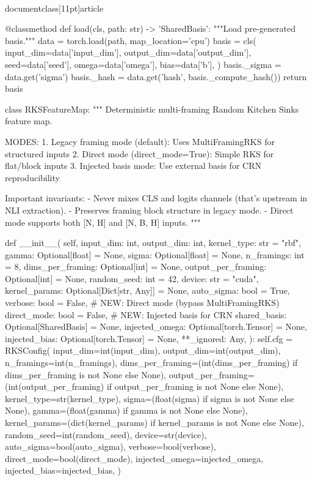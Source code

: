 \\documentclass[11pt]{article}
\begin{document}
\begin{CodeBlock}
    @classmethod
    def load(cls, path: str) -> 'SharedBasis':
        """Load pre-generated basis."""
        data = torch.load(path, map_location='cpu')
        basis = cls(
            input_dim=data['input_dim'],
            output_dim=data['output_dim'],
            seed=data['seed'],
            omega=data['omega'],
            bias=data['b'],
        )
        basis._sigma = data.get('sigma')
        basis._hash = data.get('hash', basis._compute_hash())
        return basis


class RKSFeatureMap:
    """
    Deterministic multi-framing Random Kitchen Sinks feature map.

    MODES:
    1. Legacy framing mode (default): Uses MultiFramingRKS for structured inputs
    2. Direct mode (direct_mode=True): Simple RKS for flat/block inputs
    3. Injected basis mode: Use external basis for CRN reproducibility

    Important invariants:
    - Never mixes CLS and logits channels (that's upstream in NLI extraction).
    - Preserves framing block structure in legacy mode.
    - Direct mode supports both [N, H] and [N, B, H] inputs.
    """

    def __init__(
        self,
        input_dim: int,
        output_dim: int,
        kernel_type: str = "rbf",
        gamma: Optional[float] = None,
        sigma: Optional[float] = None,
        n_framings: int = 8,
        dims_per_framing: Optional[int] = None,
        output_per_framing: Optional[int] = None,
        random_seed: int = 42,
        device: str = "cuda",
        kernel_params: Optional[Dict[str, Any]] = None,
        auto_sigma: bool = True,
        verbose: bool = False,
        # NEW: Direct mode (bypass MultiFramingRKS)
        direct_mode: bool = False,
        # NEW: Injected basis for CRN
        shared_basis: Optional[SharedBasis] = None,
        injected_omega: Optional[torch.Tensor] = None,
        injected_bias: Optional[torch.Tensor] = None,
        **_ignored: Any,
    ):
        self.cfg = RKSConfig(
            input_dim=int(input_dim),
            output_dim=int(output_dim),
            n_framings=int(n_framings),
            dims_per_framing=(int(dims_per_framing) if dims_per_framing is not None else None),
            output_per_framing=(int(output_per_framing) if output_per_framing is not None else None),
            kernel_type=str(kernel_type),
            sigma=(float(sigma) if sigma is not None else None),
            gamma=(float(gamma) if gamma is not None else None),
            kernel_params=(dict(kernel_params) if kernel_params is not None else None),
            random_seed=int(random_seed),
            device=str(device),
            auto_sigma=bool(auto_sigma),
            verbose=bool(verbose),
            direct_mode=bool(direct_mode),
            injected_omega=injected_omega,
            injected_bias=injected_bias,
        )
        

\end{CodeBlock}
\end{document}
